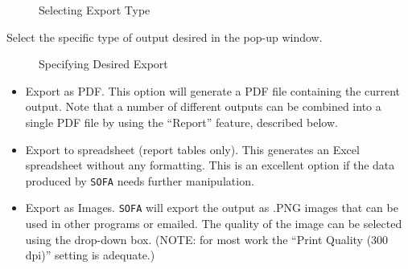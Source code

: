 \begin{figure}[H]
  \begin{center}
    \caption{Selecting Export Type}
  \end{center}
\end{figure}

Select the specific type of output desired in the pop-up window.

\begin{figure}[H]
  \begin{center}
    \caption{Specifying Desired Export}
  \end{center}
\end{figure}

\begin{itemize}
  \item Export as PDF. This option will generate a PDF file containing the current output. Note that a number of different outputs can be combined into a single PDF file by using the ``Report'' feature, described below.
  \item Export to spreadsheet (report tables only). This generates an Excel spreadsheet without any formatting. This is an excellent option if the data produced by \texttt{SOFA} needs further manipulation.
  \item Export as Images. \texttt{SOFA} will export the output as .PNG images that can be used in other programs or emailed. The quality of the image can be selected using the drop-down box. (NOTE: for most work the ``Print Quality (300 dpi)'' setting is adequate.)
\end{itemize}

